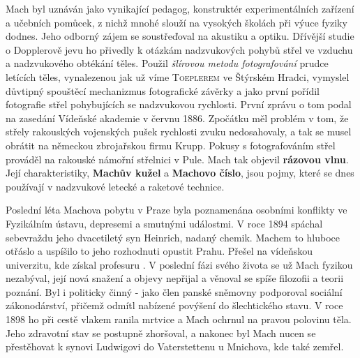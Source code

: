         Mach byl uznáván jako vynikající pedagog, konstruktér experimentálních zařízení a učebních
        pomůcek, z nichž mnohé slouží na vysokých školách při výuce fyziky dodnes. Jeho odborný
        zájem se soustřeďoval na akustiku a optiku. Dřívější studie o Dopplerově jevu ho přivedly k
        otázkám nadzvukových pohybů střel ve vzduchu a nadzvukového obtékání těles. Použil
        \emph{šlírovou metodu fotografování} prudce letících těles, vynalezenou jak už víme
        \textsc{Toeplerem} ve Štýrském Hradci, vymyslel důvtipný spouštěcí mechanizmus fotografické
        závěrky a jako první pořídil fotografie střel pohybujících se nadzvukovou rychlosti. První
        zprávu o tom podal na zasedání Vídeňské akademie v červnu 1886. Zpočátku měl problém v tom,
        že střely rakouských vojenských pušek rychlosti zvuku nedosahovaly, a tak se musel obrátit
        na německou zbrojařskou firmu Krupp. Pokusy s fotografováním střel prováděl na rakouské
        námořní střelnici v Pule. Mach tak objevil \textbf{rázovou vlnu}. Její charakteristiky,
        \textbf{Machův kužel} a \textbf{Machovo číslo}, jsou pojmy, které se dnes používají v
        nadzvukové letecké a raketové technice.

        Poslední léta Machova pobytu v Praze byla poznamenána osobními konflikty ve Fyzikálním
        ústavu, depresemi a smutnými událostmi. V roce 1894 spáchal sebevraždu jeho dvacetiletý syn
        Heinrich, nadaný chemik. Machem to hluboce otřáslo a uspíšilo to jeho rozhodnuti opustit
        Prahu. Přešel na vídeňskou univerzitu, kde získal profesuru . V poslední fázi svého života se už Mach fyzikou nezabýval, její
        nová snažení a objevy nepřijal a věnoval se spíše filozofii a teorii poznání. Byl i
        politicky činný - jako člen panské sněmovny podporoval sociální zákonodárství, přičemž
        odmítl nabízené povýšení do šlechtického stavu. V roce 1898 ho při cestě vlakem ranila
        mrtvice a Mach ochrnul na pravou polovinu těla. Jeho zdravotní stav se postupně zhoršoval, a
        nakonec byl Mach nucen se přestěhovat k synovi Ludwigovi do Vaterstettenu u Mnichova, kde
        také zemřel.

